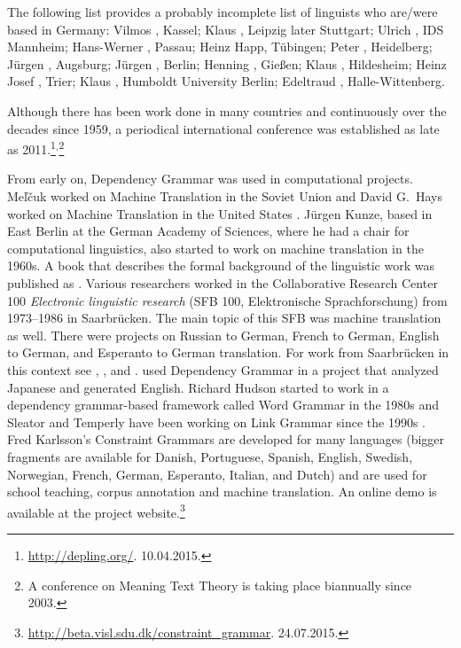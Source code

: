 The following list provides a probably incomplete list of linguists who are/were based in Germany: 
Vilmos \citet{Agel2000a-u}, Kassel; 
Klaus \citet{Baumgaertner65a-u,Baumgaertner70a}, Leipzig later Stuttgart;
Ulrich \citet{Engel77,Engel2014a}, IDS Mannheim; 
Hans-Werner \citet{Eroms85a,Eroms87b-u,Eroms2000a}, Passau; 
Heinz Happ, Tübingen;
Peter \citet{Hellwig78a-u,Hellwig2003a}, Heidelberg;
Jürgen \citet{Heringer96a-u}, Augsburg; 
Jürgen \citet{Kunze68a-u,Kunze75a-u}, Berlin;
Henning \citet{Lobin93a-u}, Gießen;
Klaus \citet{Schubert87a-u}, Hildesheim;
Heinz Josef \citet{Weber97a}, Trier;
Klaus \citet{Welke88a-u,Welke2011a-u}, Humboldt University Berlin;
Edeltraud \citet{Werner93a-u}, Halle-Wittenberg.


Although there has been work done in many countries and continuously over the decades since 1959, a
periodical international conference was established as late as 2011.\footnote{
  \url{http://depling.org/}. 10.04.2015.
}$^,$\footnote{
  A conference on Meaning Text Theory is taking place biannually since 2003.
}

From early on, Dependency Grammar was used in computational projects. Meľčuk worked on Machine
Translation in the Soviet Union \citep{Melcuk64a-u} and David G.\ Hays worked on Machine Translation
in the United States \citep{HZ60a-u}. Jürgen Kunze, based in East Berlin at the German Academy of
Sciences, where he had a chair for computational linguistics, also started to work on machine
translation in the 1960s. A book that describes the formal background of the linguistic work was
published as .  Various researchers worked in the Collaborative Research Center
100 \emph{Electronic linguistic research} (SFB 100, Elektronische Sprachforschung) from 1973--1986
in Saarbrücken. The main topic of this SFB was machine translation as well. There were projects on
Russian to German, French to German, English to German, and
Esperanto to German translation. For work from Saarbrücken in
this context see , , and .
\citet{MIF85a} used Dependency Grammar in a project that analyzed Japanese and
generated English.
Richard Hudson started to work in a dependency grammar-based framework called Word Grammar\indexwg
in the 1980s \citep{Hudson84a-u,Hudson2007a-u} and Sleator and Temperly have been working on Link
Grammar since the 1990s \citep{ST91a-u,GLS95a-u}.
Fred Karlsson's Constraint Grammars \citeyearpar{Karlsson90a-u} are developed for many languages (bigger fragments are available
for Danish, Portuguese, Spanish, English, Swedish, Norwegian, French, German, Esperanto, Italian, and
Dutch) and are used for school teaching,
corpus annotation and machine translation. An online
demo is available at the project website.\footnote{
  \url{http://beta.visl.sdu.dk/constraint_grammar}. 24.07.2015.
}

